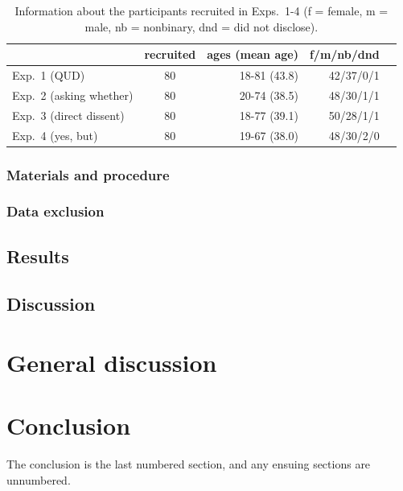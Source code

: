 \documentclass[times,linguex,xcolor]{glossa}
\begin{document}
    \begin{table}[h!]
    \centering
    \begin{tabular}{l | c | r r r }
                & recruited & ages (mean age) & f/m/nb/dnd \\ \hline
    Exp.~1 (QUD) & 80 & 18-81 (43.8) & 42/37/0/1  \\
    Exp.~2 (asking whether) & 80 & 20-74 (38.5)  & 48/30/1/1  \\
    Exp.~3 (direct dissent) & 80 & 18-77 (39.1) & 50/28/1/1  \\
    Exp.~4 (yes, but) &80 & 19-67 (38.0)  & 48/30/2/0 &  \\
    \hline
    \end{tabular}

    \caption{Information about the participants recruited in Exps.~1-4 (f = female, m = male, nb = nonbinary, dnd = did not disclose).}\label{t:recruited}
    \end{table}

  \subsubsection{Materials and procedure}

  \subsubsection{Data exclusion}

  \subsection{Results}

  \subsection{Discussion}

\section{General discussion \label{sec:4_discussion}}



\section{Conclusion \label{sec:5_conclusion}}

The conclusion is the last numbered section, and any ensuing sections are unnumbered.
\end{document}

